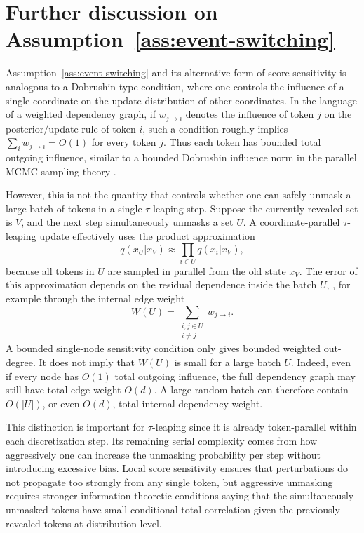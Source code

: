 \documentclass{article}
\begin{document}
\section{Further discussion on Assumption~\ref{ass:event-switching}}
\label{app:further_assump}

Assumption~\ref{ass:event-switching} and its alternative form of score sensitivity is analogous to a Dobrushin-type condition, where one controls the influence of a single coordinate on the update distribution of other coordinates. In the language of a weighted dependency graph, if $w_{j\to i}$ denotes the influence of token $j$ on the posterior/update rule of token $i$, such a condition roughly implies $\sum_{i}w_{j\to i}=O(1)$ for every token $j$. Thus each token has bounded total outgoing influence, similar to a bounded Dobrushin influence norm in the parallel MCMC sampling theory \citep{liu2025parallelize}. 

However, this is not the quantity that controls whether one can safely unmask a large batch of tokens in a single $\tau$-leaping step. Suppose the currently revealed set is $V$, and the next step simultaneously unmasks a set $U$. A coordinate-parallel $\tau$-leaping update effectively uses the product approximation
\[
q(x_U|x_V) \approx \prod_{i\in U}q(x_i|x_V),
\]
because all tokens in $U$ are sampled in parallel from the old state $x_V$. The error of this approximation depends on the residual dependence inside the batch $U$, , for example through the internal edge weight
\[
W(U)=\sum_{\substack{i,j\in U \\ i \neq j}}w_{j\to i}.
\]
A bounded single-node sensitivity condition only gives bounded weighted out-degree. It does not imply that $W(U)$ is small for a large batch $U$. Indeed, even if every node has $O(1)$ total outgoing influence, the full dependency graph may still have total edge weight $O(d)$. A large random batch can therefore contain $O(|U|)$, or even $O(d)$, total internal dependency weight.

This distinction is important for $\tau$-leaping since it is already token-parallel within each discretization step. Its remaining serial complexity comes from how aggressively one can increase the unmasking probability per step without introducing excessive bias. Local score sensitivity ensures that perturbations do not propagate too strongly from any single token, but aggressive unmasking requires stronger information-theoretic conditions \citep{dmitriev2026efficient} saying that the simultaneously unmasked tokens have small conditional total correlation given the previously revealed tokens at distribution level.
\end{document}
